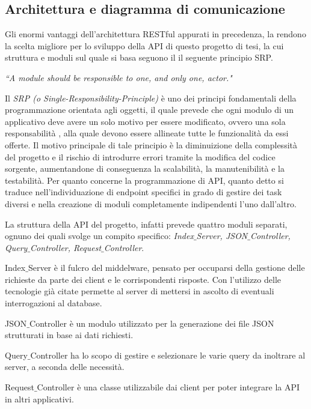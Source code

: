 \subsection{Architettura e diagramma di comunicazione}
Gli enormi vantaggi dell'architettura RESTful appurati in precedenza, la rendono la scelta migliore per lo sviluppo della API di questo progetto di tesi, la cui struttura e moduli sul quale si basa seguono il il seguente principio SRP.

\begin{center}
   \emph{``A module should be responsible to one, and only one, actor."} \cite{martin2018SoftwareStructure}
\end{center}
\thispagestyle{mystyle}
Il \emph{SRP (o Single-Responsibility-Principle)} \cite{PrinciplesOOD} \cite{martin2003agile} è uno dei principi fondamentali della programmazione orientata agli oggetti, il quale prevede che ogni modulo di un applicativo deve avere un solo motivo per essere modificato, ovvero una sola responsabilità , alla quale devono essere allineate tutte le funzionalità da essi offerte. Il motivo principale di tale principio è la diminuizione della complessità del progetto e il rischio di introdurre errori tramite la modifica del codice sorgente, aumentandone di conseguenza la scalabilità, la manutenibilità e la testabilità.
Per quanto concerne la programmazione di API, quanto detto si traduce nell'individuazione di endpoint specifici in grado di gestire dei task diversi e nella creazione di moduli completamente indipendenti l'uno dall'altro.

La struttura della API del progetto, infatti prevede quattro moduli separati, ognuno dei quali svolge un compito specifico: \emph{Index$\_$Server, JSON$\_$Controller, Query$\_$Controller, Request$\_$Controller}.

Index$\_$Server è il fulcro del middelware, pensato per occuparsi della gestione delle richieste da parte dei client e le corrispondenti risposte.
Con l'utilizzo delle tecnologie già citate permette al server di mettersi in ascolto di eventuali interrogazioni al database.

JSON$\_$Controller è un modulo utilizzato per la generazione dei file JSON strutturati in base ai dati richiesti.

Query$\_$Controller ha lo scopo di gestire e selezionare le varie query da inoltrare al server, a seconda delle necessità.

Request$\_$Controller è una classe utilizzabile dai client per poter integrare la API in altri applicativi.

